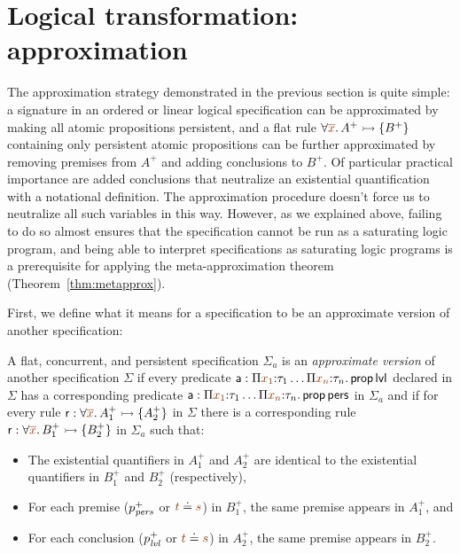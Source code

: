 \section{Logical transformation: approximation}
\label{sec:abstraction}

The approximation strategy demonstrated in the previous section is
quite simple: a signature in an ordered or linear logical
specification can be approximated by making all atomic propositions
persistent, and a flat rule $\forall \lf{\overline{x}}. \,A^+ \lefti
\{ B^+ \}$ containing only persistent atomic propositions can be
further approximated by removing premises from $A^+$ and adding
conclusions to $B^+$. Of particular practical importance are added
conclusions that neutralize an existential
quantification with a notational definition. The approximation procedure
doesn't force us to neutralize all such variables in this
way. However, as we explained above, failing to do so almost ensures
that the specification cannot be run as a saturating logic program,
and being able to interpret specifications as saturating logic
programs is a prerequisite for applying the meta-approximation theorem
(Theorem~\ref{thm:metapprox}).

First, we define what it means for a specification to be an approximate
version of another specification:

\bigskip
\begin{definition}\label{def:approxversion}
  A flat, concurrent, and persistent specification $\Sigma_a$ is an
  {\em approximate version} of another specification $\Sigma$ if every
  predicate ${\sf a} : \Pi \lf{x_1}{:}\tau_1 \ldots \Pi \lf{x_n}{:}\tau_n.\,
  {\sf prop}\,{\sf lvl}$ declared in $\Sigma$ has a corresponding
  predicate ${\sf a} : \Pi \lf{x_1}{:}\tau_1 \ldots \Pi \lf{x_n}{:}\tau_n.\,
  {\sf prop}\,{\sf pers}$ in $\Sigma_a$ and if for every rule ${\sf
    r} : \forall \lf{\overline{x}}.\,A_1^+ \lefti \{ A_2^+ \}$ in $\Sigma$ there
  is a corresponding rule ${\sf r} : \forall \lf{\overline{x}}.\,B_1^+ \lefti
  \{ B_2^+ \}$ in $\Sigma_a$ such that:
  \begin{itemize}
  \item The existential quantifiers in $A_1^+$ and $A_2^+$ are
    identical to the existential quantifiers in $B_1^+$ and $B_2^+$
    (respectively),
  \item For each premise ($p^+_{\it pers}$ or $\lf{t} \doteq \lf{s}$) in $B^+_1$,
    the same premise appears in $A^+_1$, and 
  \item For each conclusion ($p^+_{\it lvl}$ or $\lf{t}
    \doteq \lf{s}$) in $A^+_2$, the same premise appears in $B^+_2$.
  \end{itemize}
\end{definition}
\bigskip


